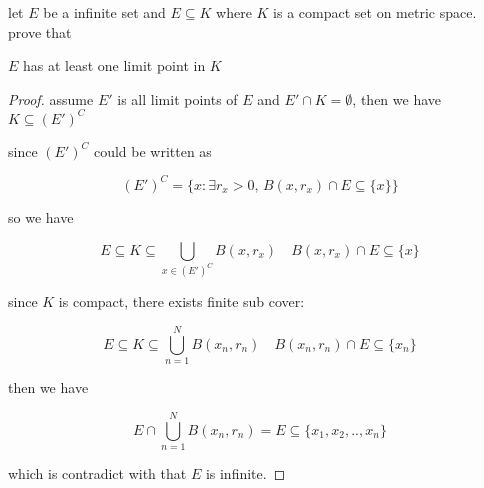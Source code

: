 \begin{exercise}
    let $E$ be a infinite set and $E \subseteq K$ where $K$ is a compact set on metric space. prove that 

    $E$ has at least one limit point in $K$
\end{exercise}

\begin{proof}
    assume  $E'$ is all limit points of $E$ and $E' \cap K = \emptyset$, then we have $K \subseteq (E')^C$

    since $(E')^C$ could be written as

    \[
        (E')^C = \{ x: \exists r_x > 0,\, B(x, r_x) \cap E \subseteq \{ x \} \}
    \]

    so we have

    \[
        E \subseteq K \subseteq \bigcup_{x \in (E')^C} B(x, r_x) \quad B(x, r_x) \cap E \subseteq \{ x \}
    \]

    since $K$ is compact, there exists finite sub cover:


    \[
        E \subseteq K \subseteq \bigcup_{n=1}^{N} B(x_n, r_n) \quad B(x_n, r_n) \cap E \subseteq \{ x_n \}
    \]

    then we have

    \[
        E \cap \bigcup_{n=1}^{N} B(x_n, r_n) = E \subseteq \{ x_1, x_2, .. , x_n \}
    \]

    which is contradict with that $E$ is infinite.
\end{proof}















